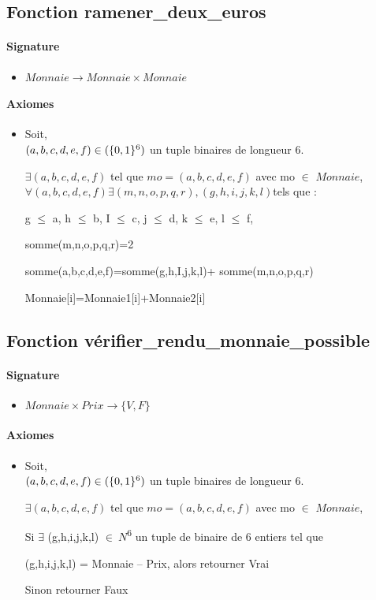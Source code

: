 \documentclass[]{article}
\begin{document}
\subsection*{Fonction ramener\_deux\_euros}
\paragraph{Signature}
\begin{itemize}
\item
  $Monnaie \longrightarrow  Monnaie \times Monnaie$
\end{itemize}
\paragraph{Axiomes}
\begin{itemize}
\item
  Soit, \\ $(a,b,c,d,e,f) \in(\{0,1\}\textsuperscript{6})$ un tuple binaires de longueur 6.

$\exists (a,b,c,d,e,f)$ tel que $mo = (a,b,c,d,e,f)$ avec mo $\in$ $Monnaie$,
$\forall (a,b,c,d,e,f) \exists (m,n,o,p,q,r), (g,h,i,j,k,l) $tels que :

g  \(\leq\) a, h \(\leq \) b, I \(\leq \) c, j \(\leq \) d, k \(\leq \) e, l \(\leq \) f,

somme(m,n,o,p,q,r)=2

somme(a,b,c,d,e,f)=somme(g,h,I,j,k,l)+ somme(m,n,o,p,q,r)

Monnaie{[}i{]}=Monnaie1{[}i{]}+Monnaie2{[}i{]}
\end{itemize}

\subsection*{Fonction vérifier\_rendu\_monnaie\_possible}
\paragraph{Signature}
\begin{itemize}
\item
  $Monnaie \times Prix \longrightarrow  \{V, F\}$
\end{itemize}
\paragraph{Axiomes}
\begin{itemize}
\item
  Soit, \\ $(a,b,c,d,e,f) \in(\{0,1\}\textsuperscript{6})$ un tuple binaires de longueur 6.

$\exists (a,b,c,d,e,f)$ tel que $mo = (a,b,c,d,e,f)$ avec mo $\in$ $Monnaie$,

Si \(\exists \) (g,h,i,j,k,l) \(\in \ N\)\textsuperscript{6} un tuple de binaire de
6 entiers tel que

(g,h,i,j,k,l) = Monnaie -- Prix, alors retourner Vrai

Sinon retourner Faux
\end{itemize}
\end{document}
